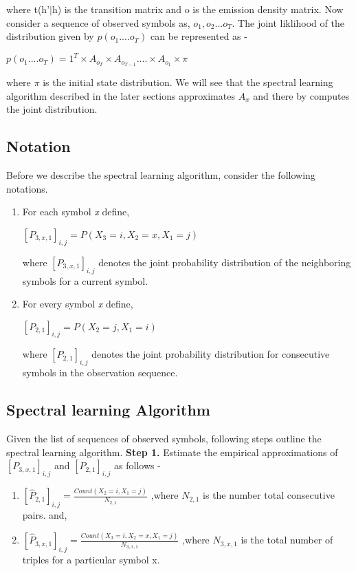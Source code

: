 \documentclass{article} %
\begin{document}
where t(h'$\vert$h) is the transition matrix and o is the emission density matrix.
Now consider a sequence of observed symbols as, $o_1,o_2...o_T$. The joint liklihood of the distribution given by $p(o_1....o_T)$ can be represented as -
\begin{center}
$p(o_1....o_T) = 1^T \times A_{o_T} \times A_{o_{T-1}} . . . . \times A_{o_1} \times \pi$
\end{center}
where $\pi$ is the initial state distribution. We will see that the spectral learning algorithm described in the later sections approximates $A_x$ and there by computes the joint distribution.

\subsection{Notation}
Before we describe the spectral learning algorithm, consider the following notations.
\begin{enumerate}
\item For each symbol \textit{x} define, 
\begin{center}
$[P_{3,x,1}]_{i,j} = P(X_3 = i, X_2 = x, X_1 = j)$
\end{center}
where $[P_{3,x,1}]_{i,j}$ denotes the joint probability distribution of the neighboring symbols for a current symbol.
\item For every symbol \textit{x} define,
\begin{center}
$[P_{2,1}]_{i,j} = P(X_2 = j, X_1 = i)$
\end{center}
where $[P_{2,1}]_{i,j}$ denotes the joint probability distribution for consecutive symbols in the observation sequence.
\end{enumerate}
\subsection{Spectral learning Algorithm}
Given the list of sequences of observed symbols, following steps outline the spectral learning algorithm.
\newline
\newline
\textbf{Step 1.} Estimate the empirical approximations of $[P_{3,x,1}]_{i,j}$ and $[P_{2,1}]_{i,j}$ as follows - 
\begin{enumerate}
 \item $[\hat{P}_{2,1}]_{i,j} = \frac{Count(X_2 = i, X_1 = j)}{N_{2,1}}$ ,where $N_{2,1}$ is the number total consecutive pairs. and,
\item $[\hat{P}_{3,x,1}]_{i,j} = \frac{Count(X_3 = i, X_2 = x, X_1 = j)}{N_{3,x,1}}$ ,where $N_{3,x,1}$ is the total number of triples for a particular symbol x.
\end{enumerate}
\end{document}
